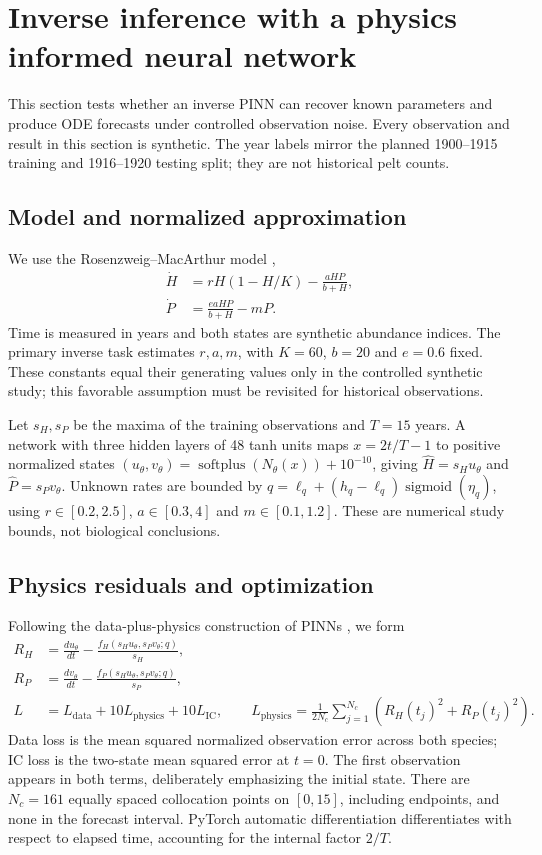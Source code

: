 \section{Inverse inference with a physics informed neural network}
This section tests whether an inverse PINN can recover known parameters and produce
ODE forecasts under controlled observation noise. Every observation and result in this
section is synthetic. The year labels mirror the planned 1900--1915 training and
1916--1920 testing split; they are not historical pelt counts.

\subsection{Model and normalized approximation}
We use the Rosenzweig--MacArthur model \cite{rosenzweig1963},
\begin{align}
\dot H&=rH(1-H/K)-\frac{aHP}{b+H},\\
\dot P&=\frac{eaHP}{b+H}-mP.
\end{align}
Time is measured in years and both states are synthetic abundance indices. The primary
inverse task estimates $r,a,m$, with $K=60$, $b=20$ and $e=0.6$ fixed. These constants
equal their generating values only in the controlled synthetic study; this favorable
assumption must be revisited for historical observations.

Let $s_H,s_P$ be the maxima of the training observations and $T=15$ years. A network
with three hidden layers of 48 tanh units maps $x=2t/T-1$ to positive normalized states
$(u_\theta,v_\theta)=\operatorname{softplus}(N_\theta(x))+10^{-10}$, giving
$\widehat H=s_Hu_\theta$ and $\widehat P=s_Pv_\theta$. Unknown rates are bounded by
$q=\ell_q+(h_q-\ell_q)\operatorname{sigmoid}(\eta_q)$, using
$r\in[0.2,2.5]$, $a\in[0.3,4]$ and $m\in[0.1,1.2]$. These are numerical study bounds,
not biological conclusions.

\subsection{Physics residuals and optimization}
Following the data-plus-physics construction of PINNs \cite{raissi2019}, we form
\begin{align}
R_H&=\frac{du_\theta}{dt}-\frac{f_H(s_Hu_\theta,s_Pv_\theta;q)}{s_H},\\
R_P&=\frac{dv_\theta}{dt}-\frac{f_P(s_Hu_\theta,s_Pv_\theta;q)}{s_P},\\
L&=L_{\mathrm{data}}+10L_{\mathrm{physics}}+10L_{\mathrm{IC}},\qquad
L_{\mathrm{physics}}=\frac{1}{2N_c}\sum_{j=1}^{N_c}(R_H(t_j)^2+R_P(t_j)^2).
\end{align}
Data loss is the mean squared normalized observation error across both species; IC
loss is the two-state mean squared error at $t=0$. The first observation appears in
both terms, deliberately emphasizing the initial state. There are $N_c=161$ equally
spaced collocation points on $[0,15]$, including endpoints, and none in the forecast
interval. PyTorch automatic differentiation \cite{pytorchgrad} differentiates with
respect to elapsed time, accounting for the internal factor $2/T$.

